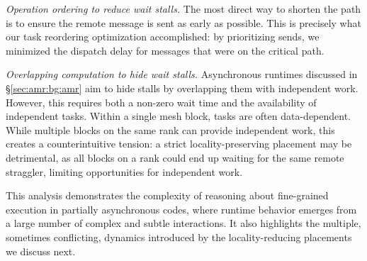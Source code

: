 \noindent\emph{Operation ordering to reduce wait stalls.
}
The most direct way to shorten the path is to ensure the remote message is sent as early as
possible.
This is precisely what our task reordering optimization accomplished: by prioritizing sends, we
minimized the dispatch delay for messages that were on the critical path.

\noindent\emph{Overlapping computation to hide wait stalls.}
Asynchronous runtimes discussed in \S\ref{sec:amr:bg:amr} aim to hide \mpiw{} stalls by overlapping
them with independent work.
However, this requires both a non-zero wait time and the availability of independent tasks.
Within a single mesh block, tasks are often data-dependent.
While multiple blocks on the same rank can provide independent work, this creates a
counterintuitive tension: a strict locality-preserving placement may be detrimental, as all blocks
on a rank could end up waiting for the same remote straggler, limiting opportunities for
independent work.

This analysis demonstrates the complexity of reasoning about fine-grained execution in partially
asynchronous codes, where runtime behavior emerges from a large number of complex and subtle
interactions.
It also highlights the multiple, sometimes conflicting, dynamics introduced by the
locality-reducing placements we discuss next.
